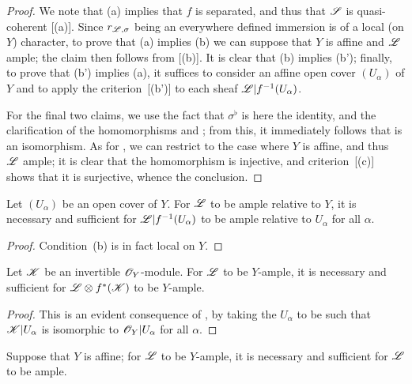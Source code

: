 \begin{proof}
We note that (a) implies that $f$ is separated, and thus that $\mathscr{S}$ is quasi-coherent [(a)].
Since $r_{\mathscr{L},\sigma}$ being an everywhere defined immersion is of a local (on $Y$) character, to prove that (a) implies (b) we can suppose that $Y$ is affine and $\mathscr{L}$ ample;
the claim then follows from [(b)].
It is clear that (b) implies (b');
finally, to prove that (b') implies (a), it suffices to consider an affine open cover $(U_\alpha)$ of $Y$ and to apply the criterion~[(b')] to each sheaf $\mathscr{L}|f^{-1}(U_\alpha)$.

For the final two claims, we use the fact that $\sigma^\flat$ is here the identity, and the clarification of the homomorphisms  and ;
from this, it immediately follows that  is an isomorphism.
As for , we can restrict to the case where $Y$ is affine, and thus $\mathscr{L}$ ample;
it is clear that the homomorphism  is injective, and criterion~[(c)] shows that it is surjective, whence the conclusion.
\end{proof}

\begin{corollary}[4.6.4]
\label{II.4.6.4}
Let $(U_\alpha)$ be an open cover of $Y$.
For $\mathscr{L}$ to be ample relative to $Y$, it is necessary and sufficient for $\mathscr{L}|f^{-1}(U_\alpha)$ to be ample relative to $U_\alpha$ for all $\alpha$.
\end{corollary}

\begin{proof}
Condition~(b) is in fact local on $Y$.
\end{proof}

\begin{corollary}[4.6.5]
\label{II.4.6.5}
Let $\mathscr{K}$ be an invertible $\mathscr{O}_Y$-module.
For $\mathscr{L}$ to be $Y$-ample, it is necessary and sufficient for $\mathscr{L}\otimes f^*(\mathscr{K})$ to be $Y$-ample.
\end{corollary}

\begin{proof}
This is an evident consequence of , by taking the $U_\alpha$ to be such that $\mathscr{K}|U_\alpha$ is isomorphic to $\mathscr{O}_Y|U_\alpha$ for all $\alpha$.
\end{proof}

\begin{corollary}[4.6.6]
\label{II.4.6.6}
Suppose that $Y$ is affine;
for $\mathscr{L}$ to be $Y$-ample, it is necessary and sufficient for $\mathscr{L}$ to be ample.
\end{corollary}

